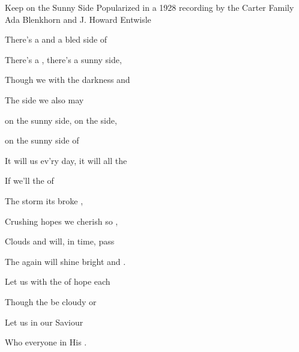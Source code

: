 \begin{SBSong}{Keep on the Sunny Side}
  {Popularized in a 1928 recording by the Carter Family}
  {Ada Blenkhorn and J. Howard Entwisle}
  \begin{SBVerse}
    There's a  and a bled side of 

    There's a , there's a sunny side, 

    Though we  with the darkness and 

    The  side we also may 
  \end{SBVerse}
  \begin{SBChorus}
     on the sunny side,  on the  side,

     on the sunny side of 
    
    It will  us ev'ry day, it will  all the 
    
    If we'll   the   of 
  \end{SBChorus}
  \begin{SBVerse}
    The storm  its  broke ,
    
    Crushing hopes  we cherish so ,
    
    Clouds and  will, in time, pass 
    
    The  again will shine bright and .
  \end{SBVerse}
  \begin{SBVerse}
    Let us  with the  of hope each 
    
    Though the  be cloudy or 
    
    Let us  in our Saviour 
    
    Who  everyone in His .
  \end{SBVerse}
\end{SBSong}

